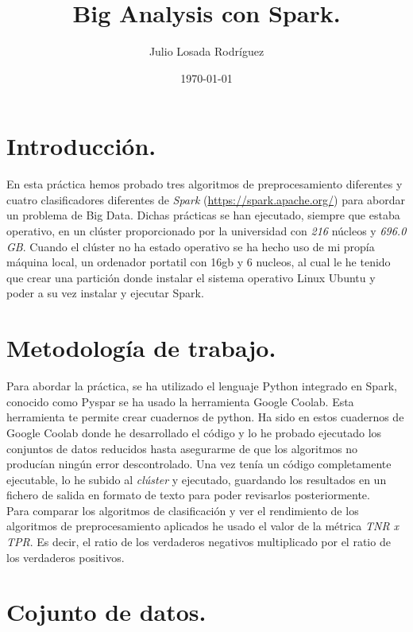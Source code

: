 \documentclass[11pt]{article}
\title{Big Analysis con Spark.}
\author{Julio Losada Rodríguez}
\date{\today}
\begin{document}
\maketitle

\section{Introducción.}

En esta práctica hemos probado tres algoritmos de preprocesamiento diferentes y cuatro clasificadores diferentes de \textit{Spark} (\href{https://spark.apache.org/}{https://spark.apache.org/}) para abordar un problema de Big Data. Dichas prácticas se han ejecutado, siempre que estaba operativo, en un clúster proporcionado por la universidad con \textit{216} núcleos y \textit{696.0 GB}. Cuando el clúster no ha estado operativo se ha hecho uso de mi propía máquina local, un ordenador portatil con 16gb y 6 nucleos, al cual le he tenido que crear una partición donde instalar el sistema operativo Linux Ubuntu y poder a su vez instalar y ejecutar Spark. 

\section{Metodología de trabajo.}

Para abordar la práctica, se ha utilizado el lenguaje Python integrado en Spark, conocido como Pyspar se ha usado la herramienta Google Coolab. Esta herramienta te permite crear cuadernos de python. Ha sido en estos cuadernos de Google Coolab donde he desarrollado el código y lo he probado ejecutado los conjuntos de datos reducidos hasta asegurarme de que los algoritmos no producían ningún error descontrolado. Una vez tenía un código completamente ejecutable, lo he subido al \textit{clúster} y ejecutado, guardando los resultados en un fichero de salida en formato de texto para poder revisarlos posteriormente. \\

Para comparar los algoritmos de clasificación y ver el rendimiento de los algoritmos de preprocesamiento aplicados he usado el valor de la métrica \textit{TNR x TPR}. Es decir, el ratio de los verdaderos negativos multiplicado por el ratio de los verdaderos positivos.

\section{Cojunto de datos.}
\end{document}

